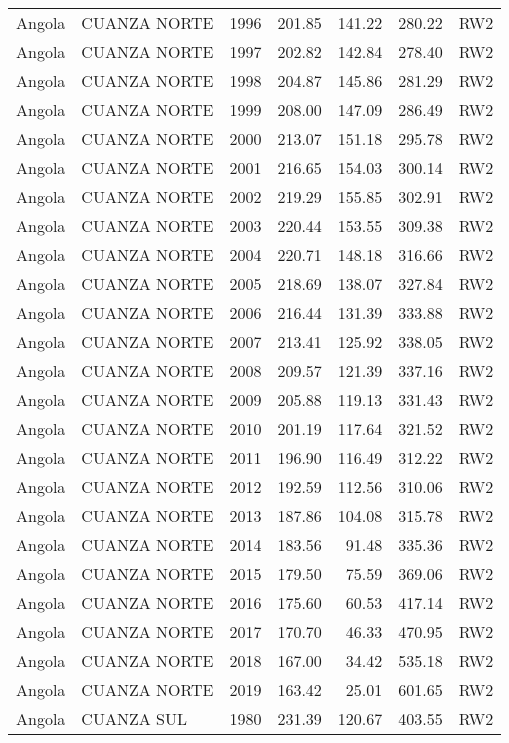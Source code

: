 \begin{longtable}{lllrrrl}
  Angola & CUANZA NORTE & 1996 & 201.85 & 141.22 & 280.22 & RW2 \\ 
  Angola & CUANZA NORTE & 1997 & 202.82 & 142.84 & 278.40 & RW2 \\ 
  Angola & CUANZA NORTE & 1998 & 204.87 & 145.86 & 281.29 & RW2 \\ 
  Angola & CUANZA NORTE & 1999 & 208.00 & 147.09 & 286.49 & RW2 \\ 
  Angola & CUANZA NORTE & 2000 & 213.07 & 151.18 & 295.78 & RW2 \\ 
  Angola & CUANZA NORTE & 2001 & 216.65 & 154.03 & 300.14 & RW2 \\ 
  Angola & CUANZA NORTE & 2002 & 219.29 & 155.85 & 302.91 & RW2 \\ 
  Angola & CUANZA NORTE & 2003 & 220.44 & 153.55 & 309.38 & RW2 \\ 
  Angola & CUANZA NORTE & 2004 & 220.71 & 148.18 & 316.66 & RW2 \\ 
  Angola & CUANZA NORTE & 2005 & 218.69 & 138.07 & 327.84 & RW2 \\ 
  Angola & CUANZA NORTE & 2006 & 216.44 & 131.39 & 333.88 & RW2 \\ 
  Angola & CUANZA NORTE & 2007 & 213.41 & 125.92 & 338.05 & RW2 \\ 
  Angola & CUANZA NORTE & 2008 & 209.57 & 121.39 & 337.16 & RW2 \\ 
  Angola & CUANZA NORTE & 2009 & 205.88 & 119.13 & 331.43 & RW2 \\ 
  Angola & CUANZA NORTE & 2010 & 201.19 & 117.64 & 321.52 & RW2 \\ 
  Angola & CUANZA NORTE & 2011 & 196.90 & 116.49 & 312.22 & RW2 \\ 
  Angola & CUANZA NORTE & 2012 & 192.59 & 112.56 & 310.06 & RW2 \\ 
  Angola & CUANZA NORTE & 2013 & 187.86 & 104.08 & 315.78 & RW2 \\ 
  Angola & CUANZA NORTE & 2014 & 183.56 & 91.48 & 335.36 & RW2 \\ 
  Angola & CUANZA NORTE & 2015 & 179.50 & 75.59 & 369.06 & RW2 \\ 
  Angola & CUANZA NORTE & 2016 & 175.60 & 60.53 & 417.14 & RW2 \\ 
  Angola & CUANZA NORTE & 2017 & 170.70 & 46.33 & 470.95 & RW2 \\ 
  Angola & CUANZA NORTE & 2018 & 167.00 & 34.42 & 535.18 & RW2 \\ 
  Angola & CUANZA NORTE & 2019 & 163.42 & 25.01 & 601.65 & RW2 \\ 
  Angola & CUANZA SUL & 1980 & 231.39 & 120.67 & 403.55 & RW2 \\ 

\end{longtable}
